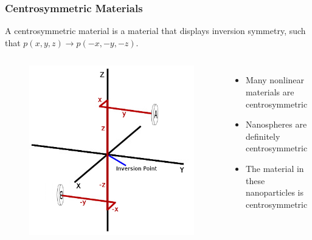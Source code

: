 \documentclass{beamer}
\begin{document}
\begin{frame}
\frametitle{Centrosymmetric Materials}
A centrosymmetric material is a material that displays inversion symmetry, such that $p(x,y,z)\rightarrow p(-x,-y,-z)$.
\begin{columns}
\begin{figure}
\centering
\includegraphics[width=\textwidth]{centro}
\end{figure}
\begin{itemize}
\item Many nonlinear materials are centrosymmetric
\item Nanospheres are definitely centrosymmetric
\item The material in these nanoparticles is centrosymmetric
\end{itemize}
\end{columns}
\end{frame}
\end{document}
